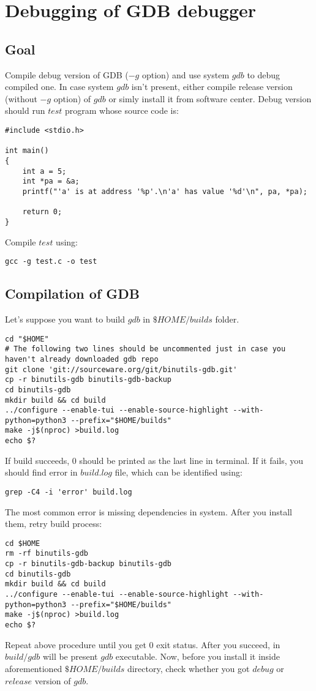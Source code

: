 \documentclass{report}
\begin{document}
\chapter *{Debugging of GDB debugger}
\section *{Goal}
Compile debug version of GDB ($-g$ option) and use system $gdb$ to debug compiled one. In case system $gdb$ isn't present, either compile release version (without $-g$ option) of $gdb$ or simly install it from software center. Debug version should run $test$ program whose source code is:
\begin{verbatim}
#include <stdio.h>

int main()
{
	int a = 5;
	int *pa = &a;
	printf("'a' is at address '%p'.\n'a' has value '%d'\n", pa, *pa);

	return 0;
}
\end{verbatim}
Compile $test$ using:
\begin{verbatim}
gcc -g test.c -o test
\end{verbatim}
\section *{Compilation of GDB}
Let's suppose you want to build $gdb$ in $\$HOME/builds$ folder. 
\begin{verbatim}
cd "$HOME"
# The following two lines should be uncommented just in case you haven't already downloaded gdb repo
git clone 'git://sourceware.org/git/binutils-gdb.git'
cp -r binutils-gdb binutils-gdb-backup   
cd binutils-gdb
mkdir build && cd build
../configure --enable-tui --enable-source-highlight --with-python=python3 --prefix="$HOME/builds"
make -j$(nproc) >build.log
echo $?
\end{verbatim}
If build succeeds, $0$ should be printed as the last line in terminal. If it fails, you should find error in $build.log$ file, which can be identified using:
\begin{verbatim}
grep -C4 -i 'error' build.log
\end{verbatim}
The most common error is missing dependencies in system. After you install them, retry build process:
\begin{verbatim}
cd $HOME
rm -rf binutils-gdb
cp -r binutils-gdb-backup binutils-gdb
cd binutils-gdb
mkdir build && cd build
../configure --enable-tui --enable-source-highlight --with-python=python3 --prefix="$HOME/builds"
make -j$(nproc) >build.log
echo $?
\end{verbatim}
Repeat above procedure until you get $0$ exit status. After you succeed, in $build/gdb$ will be present $gdb$ executable. Now, before you install it inside aforementioned $\$HOME/builds$ directory, check whether you got $debug$ or $release$ version of $gdb$.
\end{document}
